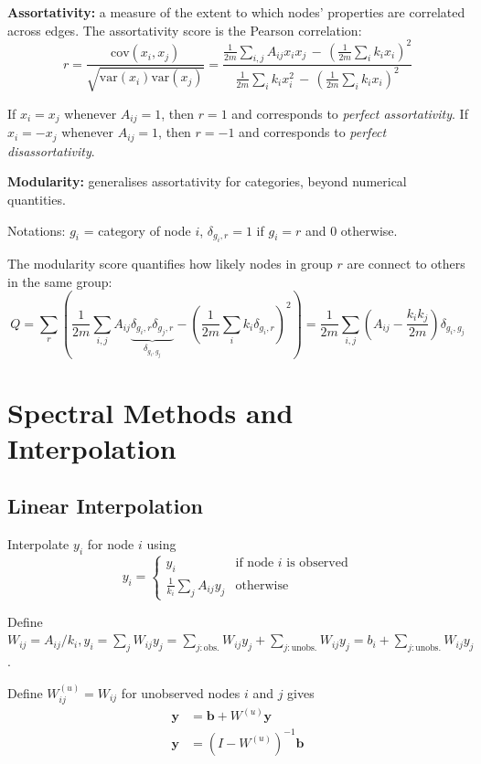 \documentclass[12pt]{article}
\begin{document}
\textbf{Assortativity:} a measure of the extent to which nodes' properties are correlated across edges. The assortativity score is the Pearson correlation:
$$
r = \frac{\text{cov}(x_i, x_j)}{\sqrt{\text{var}(x_i)\text{var}(x_j)}} = \frac{\frac{1}{2m} \sum_{i,j} A_{ij} x_i x_j \, - \, \left(\frac{1}{2m}\sum_i k_i x_i\right)^2}{\frac{1}{2m}\sum_i k_i x_i^2 \, - \, \left(\frac{1}{2m}\sum_i k_i x_i\right)^2}
$$

If $x_i = x_j$ whenever $A_{ij} = 1$, then $r = 1$ and corresponds to \textit{perfect assortativity}. 
If $x_i = -x_j$ whenever $A_{ij} = 1$, then $r = -1$ and corresponds to \textit{perfect disassortativity}.

\textbf{Modularity:} generalises assortativity for categories, beyond numerical quantities.

Notations: $g_i$ = category of node $i$, $\delta_{g_i,r} = 1$ if $g_i = r$ and 0 otherwise.

The modularity score quantifies how likely nodes in group $r$ are connect to others in the same group:
$$
Q = \sum_r \left( \frac{1}{2m}\sum_{i,j} A_{ij} \underbrace{\delta_{g_i,r} \delta_{g_j,r}}_{\delta_{g_i, g_j}} - \left(\frac{1}{2m}\sum_i k_i \delta_{g_i,r}\right)^2 \right)
= \frac{1}{2m} \sum_{i,j} \left(A_{ij} - \frac{k_i k_j}{2m} \right) \delta_{g_i, g_j}
$$

\section{Spectral Methods and Interpolation}
\subsection{Linear Interpolation}
Interpolate $y_i$ for node $i$ using
$$
y_i =
\begin{cases}
y_i & \text{if node $i$ is observed} \\
\frac{1}{k_i}\sum_j A_{ij} y_j & \text{otherwise}
\end{cases}
$$

Define $W_{ij} = A_{ij}/k_i,
    y_i = \sum_j W_{ij} y_j
    = \sum_{j:\text{obs.}} W_{ij} y_j + \sum_{j:\text{unobs.}} W_{ij} y_j
    = b_i + \sum_{j:\text{unobs.}} W_{ij} y_j$.

Define $W_{ij}^{(u)} = W_{ij}$ for unobserved nodes $i$ and $j$ gives
\begin{align*}
\boldsymbol{y} &= \boldsymbol{b} + W^{(u)} \boldsymbol{y} \\
\boldsymbol{y} &= \left(I - W^{(u)}\right)^{-1} \boldsymbol{b}
\end{align*}
\end{document}
